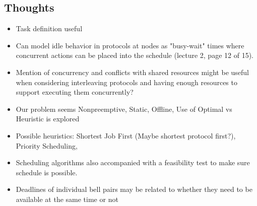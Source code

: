 \documentclass{article}
\begin{document}
\subsection{Thoughts}
\begin{itemize}
    \item Task definition useful
    \item Can model idle behavior in protocols at nodes as "busy-wait" times where concurrent actions can be placed into the schedule (lecture 2, page 12 of 15).
    \item Mention of concurrency and conflicts with shared resources might be useful when considering interleaving protocols and having enough resources to support executing them concurrently?
    \item Our problem seems Nonpreemptive, Static, Offline, Use of Optimal vs Heuristic is explored
    \item Possible heuristics: Shortest Job First (Maybe shortest protocol first?), Priority Scheduling,
    \item Scheduling algorithms also accompanied with a feasibility test to make sure schedule is possible.
    \item Deadlines of individual bell pairs may be related to whether they need to be available at the same time or not
\end{itemize}
\end{document}
